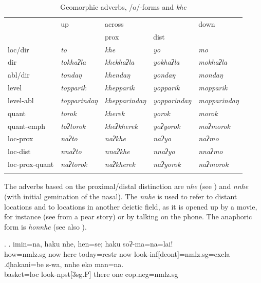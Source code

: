  \begin{table}[htp]
\begin{centering}
\begin{tabular}{lllll}
\lsptoprule
									&{\sc up}		&\multicolumn{2}{l}{{\sc across}}&{\sc down}\\
											&				&{\sc prox}&{\sc dist}&\\
\midrule 	  
			{\sc loc/dir}	&\emph{to}&\emph{khe}&\emph{yo}&\emph{mo}\\
			{\sc dir} 				&\emph{tokhaʔla}&\emph{khekhaʔla}&\emph{yokhaʔla}&\emph{mokhaʔla}\\
			{\sc abl/dir}											&\emph{tondaŋ}&\emph{khendaŋ}&\emph{yondaŋ}&\emph{mondaŋ}\\
			{\sc level}											&\emph{topparik}&\emph{khepparik}&\emph{yopparik}&\emph{mopparik}\\
			{\sc level-abl}									&\emph{topparindaŋ}&\emph{khepparindaŋ}&\emph{yopparindaŋ}&\emph{mopparindaŋ}\\
			{\sc quant} 					&\emph{torok}&\emph{kherek}&\emph{yorok}&\emph{morok}\\
			{\sc quant-emph}								&\emph{toʔtorok}&\emph{kheʔkherek}&\emph{yoʔyorok}&\emph{moʔmorok}\\
			{\sc loc-prox}									&\emph{naʔto}&\emph{naʔkhe}&\emph{naʔyo}&\emph{naʔmo}\\
			{\sc loc-dist}										&\emph{nnaʔto}&\emph{nnaʔkhe}&\emph{nnaʔyo}&\emph{nnaʔmo}\\
			{\sc loc-prox-quant}					&\emph{naʔtorok}&\emph{naʔkherek}&\emph{naʔyorok}&\emph{naʔmorok}\\
\lspbottomrule
\end{tabular} 
\caption{Geomorphic adverbs, /o/-forms and \emph{khe}}\label{deic-all2}
\end{centering}
\end{table}


The adverbs based on the proximal/distal distinction are \emph{nhe}  (see \Next[a]) and \emph{nnhe}  (with initial gemination of the nasal). The  \emph{nnhe} is used to refer to distant locations and to locations in another deictic field, as it is opened up by a movie, for instance  (see \Next[b] from a pear story) or by talking on the phone. The anaphoric form is \emph{honnhe}  (see also ). 

\ex. \ag. imin=na,       haku nhe, hen=se;         haku soʔ-ma=na=lai!\\
how{\sc =nmlz.sg}  now here today{\sc =restr} now look{\sc -inf[deont]=nmlz.sg=excla}\\
  
\bg.ɖhakani=be    s-wa,         nnhe  eko man=na.\\
basket{\sc =loc} look{\sc -npst[3sg.P]} there one {\sc cop.neg=nmlz.sg}\\
 


